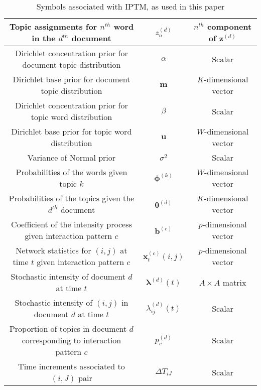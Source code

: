 \documentclass[a4paper]{article}
\begin{document}
\begin{table}[ht]
{\begin{tabular}{ |c|c|c|}
  			\hline 
  			Topic assignments for $n^{th}$ word in the $d^{th}$ document&${z}_n^{(d)}$ & $n^{th}$ component of $\boldsymbol{z}^{(d)}$\\
  			\hline 	
  			Dirichlet concentration prior for document topic distribution&$\alpha$ & Scalar \\
  			\hline	
  			Dirichlet base prior for document topic distribution&$\boldsymbol{m}$ & $K$-dimensional vector \\
  			\hline			
  			Dirichlet concentration prior for topic word distribution&$\beta$ & Scalar \\
  			\hline			 
  			Dirichlet base prior for topic word distribution&$\boldsymbol{u}$ & $W$-dimensional vector  \\
  			\hline				 	
  			Variance of Normal prior&$\sigma^2$ & Scalar \\
  			\hline		
  			Probabilities of the words given topic $k$ &$\boldsymbol{\phi}^{(k)}$ & $W$-dimensional vector\\
  			\hline
  			Probabilities of the topics given the $d^{th}$ document &$\boldsymbol{\theta}^{(d)}$ & $K$-dimensional vector\\
  			\hline		
  			Coefficient of the intensity process given interaction pattern $c$ &$\boldsymbol{b}^{(c)}$ & $p$-dimensional vector\\
  			\hline		
  			Network statistics for $(i, j)$ at time $t$ given interaction pattern $c$ &$\boldsymbol{x}^{(c)}_t{(i,j)}$ & $p$-dimensional vector\\
  			\hline		
  			Stochastic intensity of document $d$ at time $t$ & $\boldsymbol{\lambda}^{(d)}(t)$ & $A\times A$ matrix\\
  			\hline
  		  	Stochastic intensity of $(i, j)$ in document $d$ at time $t$ & ${\lambda}_{ij}^{(d)}(t)$ & Scalar\\
  		  	\hline	
  		  	  		  	Proportion of topics in document $d$ corresponding to interaction pattern $c$ & $p_c^{(d)}$ & Scalar\\
  		  	  		  	\hline
  		  Time increments associated to $(i, J)$ pair & $\Delta T_{iJ}$ & Scalar\\
  		  		\hline
  			\hline
  		\end{tabular}}
  		\caption {Symbols associated with IPTM, as used in this paper}
  		\label{table:SymbolsIPTM}
  	\end{table}
  	\normalsize
\end{document}
